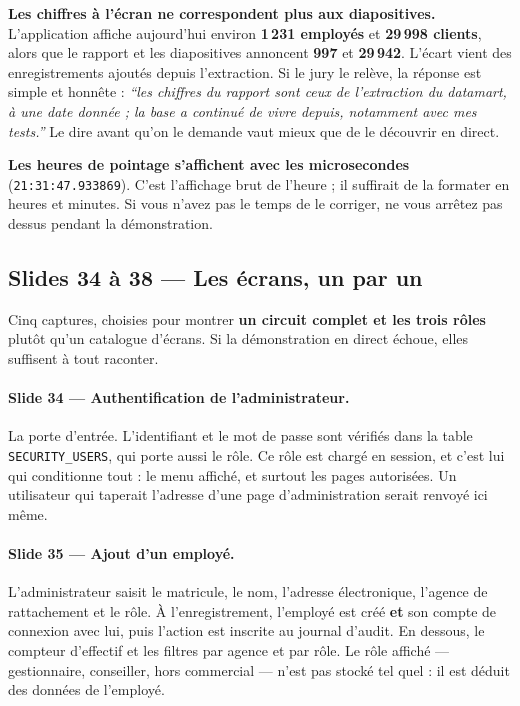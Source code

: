 \documentclass[a4paper,11pt]{article}
\begin{document}
\begin{corrige}[title={Deux points à régler avant la soutenance}]
\textbf{Les chiffres à l'écran ne correspondent plus aux diapositives.}
L'application affiche aujourd'hui environ \textbf{1\,231 employés} et
\textbf{29\,998 clients}, alors que le rapport et les diapositives annoncent
\textbf{997} et \textbf{29\,942}. L'écart vient des enregistrements ajoutés
depuis l'extraction. Si le jury le relève, la réponse est simple et honnête :
\emph{\enquote{les chiffres du rapport sont ceux de l'extraction du datamart, à
une date donnée ; la base a continué de vivre depuis, notamment avec mes tests.}}
Le dire avant qu'on le demande vaut mieux que de le découvrir en direct.

\medskip
\textbf{Les heures de pointage s'affichent avec les microsecondes}
(\texttt{21:31:47.933869}). C'est l'affichage brut de l'heure ; il suffirait de
la formater en heures et minutes. Si vous n'avez pas le temps de le corriger, ne
vous arrêtez pas dessus pendant la démonstration.
\end{corrige}

\subsection*{Slides 34 à 38 --- Les écrans, un par un}

Cinq captures, choisies pour montrer \textbf{un circuit complet et les trois
rôles} plutôt qu'un catalogue d'écrans. Si la démonstration en direct échoue,
elles suffisent à tout raconter.

\paragraph{Slide 34 --- Authentification de l'administrateur.}
La porte d'entrée. L'identifiant et le mot de passe sont vérifiés dans la table
\texttt{SECURITY\_USERS}, qui porte aussi le rôle. Ce rôle est chargé en session,
et c'est lui qui conditionne tout : le menu affiché, et surtout les pages
autorisées. Un utilisateur qui taperait l'adresse d'une page d'administration
serait renvoyé ici même.

\paragraph{Slide 35 --- Ajout d'un employé.}
L'administrateur saisit le matricule, le nom, l'adresse électronique, l'agence
de rattachement et le rôle. À l'enregistrement, l'employé est créé \textbf{et}
son compte de connexion avec lui, puis l'action est inscrite au journal d'audit.
En dessous, le compteur d'effectif et les filtres par agence et par rôle. Le
rôle affiché --- gestionnaire, conseiller, hors commercial --- n'est pas stocké
tel quel : il est déduit des données de l'employé.
\end{document}
